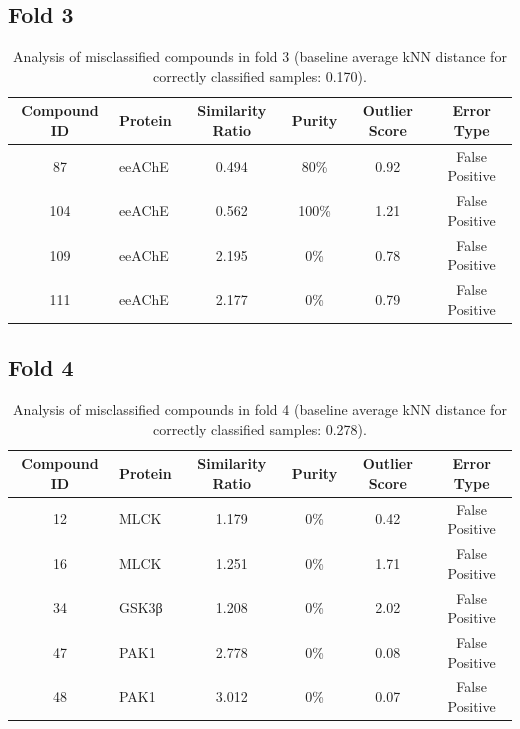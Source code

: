 \documentclass{article}
\newenvironment{smarttabular}[1]{%
    \begin{tabular}{#1}%
}{%
    \end{tabular}%
}
\begin{document}
\clearpage

\subsection{Fold 3}

\begin{table}[H]
    \centering
    \small
    \caption{Analysis of misclassified compounds in fold 3 (baseline average kNN distance for correctly classified samples: 0.170).}
    \label{tab:misclassified_compounds_3}
    \begin{smarttabular}{clcccc}
        \toprule
        \textbf{Compound ID} & \textbf{Protein} & \textbf{Similarity Ratio} & \textbf{Purity} & \textbf{Outlier Score} & \textbf{Error Type} \\
        \midrule
        87 & eeAChE & 0.494 & 80\% & 0.92 & False Positive \\
        104 & eeAChE & 0.562 & 100\% & 1.21 & False Positive \\
        109 & eeAChE & 2.195 & 0\% & 0.78 & False Positive \\
        111 & eeAChE & 2.177 & 0\% & 0.79 & False Positive \\
        \bottomrule
    \end{smarttabular}
\end{table}

\clearpage

\subsection{Fold 4}

\begin{table}[H]
    \centering
    \small
    \caption{Analysis of misclassified compounds in fold 4 (baseline average kNN distance for correctly classified samples: 0.278).}
    \label{tab:misclassified_compounds_4}
    \begin{smarttabular}{clcccc}
        \toprule
        \textbf{Compound ID} & \textbf{Protein} & \textbf{Similarity Ratio} & \textbf{Purity} & \textbf{Outlier Score} & \textbf{Error Type} \\
        \midrule
        12 & MLCK & 1.179 & 0\% & 0.42 & False Positive \\
        16 & MLCK & 1.251 & 0\% & 1.71 & False Positive \\
        34 & GSK3β & 1.208 & 0\% & 2.02 & False Positive \\
        47 & PAK1 & 2.778 & 0\% & 0.08 & False Positive \\
        48 & PAK1 & 3.012 & 0\% & 0.07 & False Positive \\
        \bottomrule
    \end{smarttabular}
\end{table}
\end{document}
